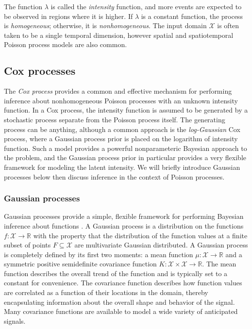 \documentclass{article}
\newcommand{\cm}[1]{\mathcal{#1}}
\newcommand{\R}{\mathbb{R}}
\begin{document}
The function $\lambda$ is called the \emph{intensity} function, and
more events are expected to be observed in regions where it is higher.
If $\lambda$ is a constant function, the process is
\emph{homogeneous}; otherwise, it is \emph{nonhomogeneous}.  The input
domain $\cm{X}$ is often taken to be a single temporal dimension,
however spatial and spatiotemporal Poisson process models are also
common.

\subsection{Cox processes}

The \emph{Cox process} provides a common and effective mechanism for
performing inference about nonhomogeneous Poisson processes with an
unknown intensity function.  In a Cox process, the intensity function
is assumed to be generated by a stochastic process separate from the
Poisson process itself.  The generating process can be anything,
although a common approach is the \emph{log-Gaussian} Cox process,
where a Gaussian process prior is placed on the logarithm of intensity
function.  Such a model provides a powerful nonparameteric Bayesian
approach to the problem, and the Gaussian process prior in particular
provides a very flexible framework for modeling the latent intensity.
We will briefly introduce Gaussian processes below then discuss
inference in the context of Poisson processes.

\subsubsection{Gaussian processes}

Gaussian processes provide a simple, flexible framework for performing
Bayesian inference about functions \citep{gpml}.  A Gaussian process
is a distribution on the functions $f\colon \cm{X} \to \R$ with the
property that the distribution of the function values at a finite
subset of points $F \subseteq \cm{X}$ are multivariate Gaussian
distributed. A Gaussian process is completely defined by its first two
moments: a mean function $\mu\colon \cm{X} \to \R$ and a symmetric
positive semidefinite covariance function $K\colon \cm{X} \times
\cm{X} \to \R$.  The mean function describes the overall trend of the
function and is typically set to a constant for convenience.  The
covariance function describes how function values are correlated as a
function of their locations in the domain, thereby encapsulating
information about the overall shape and behavior of the signal.  Many
covariance functions are available to model a wide variety of
anticipated signals.
\end{document}
